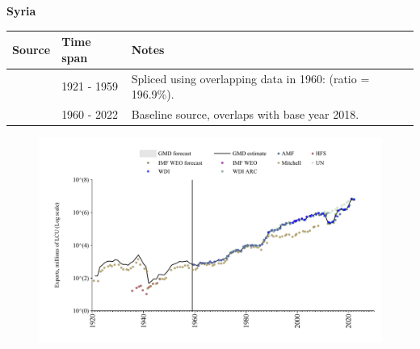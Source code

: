 \documentclass[12pt,a4paper,landscape]{article}
\begin{document}
\begin{adjustbox}{max totalsize={\paperwidth}{\paperheight},center}
\begin{minipage}[t][\textheight][t]{\textwidth}
\vspace*{0.5cm}
{}
\begin{center}
{\Large\bfseries Syria}
\end{center}
\vspace{0.5cm}
\begin{table}[H]
\centering
\small
\begin{tabular}{|l|l|l|}
\hline
\textbf{Source} & \textbf{Time span} & \textbf{Notes} \\
\hline
\rowcolor{white}\cite{Mitchell}& 1921 - 1959 &Spliced using overlapping data in 1960: (ratio = 196.9\%).\\
\rowcolor{lightgray}\cite{WDI}& 1960 - 2022 &Baseline source, overlaps with base year 2018.\\
\hline
\end{tabular}
\end{table}
\begin{figure}[H]
\centering
\includegraphics[width=\textwidth,height=0.6\textheight,keepaspectratio]{graphs/SYR_exports.pdf}
\end{figure}
\end{minipage}
\end{adjustbox}
\end{document}
